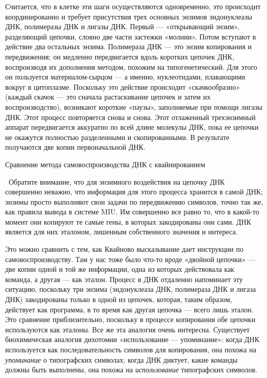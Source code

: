 Считается, что в клетке эти шаги осуществляются одновременно, это происходит координированно и требует присутствия трех основных энзимов эндонуклеазы ДНК, полимеразы ДНК и лигазы ДНК. Первый --- «открывающий энзим», разделяющий цепочки, словно две части застежки «молнии». Потом вступают в действие два остальных энзима. Полимераза ДНК --- это энзим копирования и передвижения; он медленно передвигается вдоль коротких цепочек ДНК, воспроизводя их дополнения методом, похожим на типогенетический. Для этого он пользуется материалом-сырцом --- а именно, нуклеотидами, плавающими вокруг в цитоплазме. Поскольку это действие происходит «скачкообразно» (каждый скачок --- это сначала растаскивание цепочек и затем их воспроизводство), возникают короткие «паузы», заполняемые при помощи лигазы ДНК. Этот процесс повторяется снова и снова. Этот отлаженный трехэнзимный аппарат передвигается аккуратно по всей длине молекулы ДНК, пока ее цепочки не окажутся полностью разделенными и скопированными. В результате получаются две копии первоначальной ДНК.

Сравнение метода самовоспроизводства ДНК с квайнированием

~Обратите внимание, что для энзимного воздействия на цепочку ДНК совершенно неважно, что информация для этого процесса хранится в самой ДНК; энзимы просто выполняют свои задачи по передвижению символов, точно так же, как правила вывода в системе MIU. Им совершенно все равно то, что в какой-то момент они копируют те самые гены, в которых закодированы они сами. ДНК является для них эталоном, лишенным собственного значения и интереса.

Это можно сравнить с тем, как Квайново высказывание дает инструкции по самовоспроизводству. Там у нас тоже было что-то вроде «двойной цепочки» --- две копии одной и той же информации, одна из которых действовала как команда, а другая --- как эталон. Процесс в ДНК отдаленно напоминает эту ситуацию, поскольку три энзима (эндонуклеаза ДНК, полимераза ДНК и лигаза ДНК) закодированы только в одной из цепочек, которая, таким образом, действует как программа, в то время как другая цепочка --- всего лишь эталон. Это сравнение приблизительно, поскольку в процессе копирования обе цепочки используются как эталоны. Все же эта аналогия очень интересна. Существует биохимическая аналогия дихотомии «использование --- упоминание»: когда ДНК используется как последовательность символов для копирования, она похожа на \emph{упоминание} о типографских символах; когда ДНК диктует, какие команды должны быть выполнены, она похожа на \emph{использование} типографских символов.

